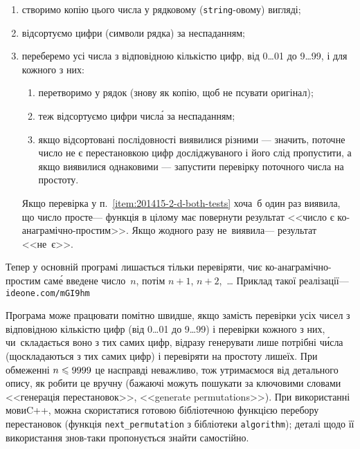 \begin{enumerate}
\item
створимо копію цього числа у рядковому (\texttt{string}-овому) вигляді;
\item
відсортуємо цифри (символи рядка) за неспаданням;
\item
переберемо усі числа з відповідною кількістю цифр, від 0\dots01 до 9\dots99, і для кожного з них:
\begin{enumerate}
\item
перетворимо у рядок (знову як копію, щоб не псувати оригінал);
\item
теж відсортуємо цифри числ\'{а} за неспаданням;
\item \label{item:201415-2-d-both-tests}
якщо відсортовані послідовності виявилися різними --- значить, поточне число не є перестановкою цифр досліджуваного і його слід пропустити, а якщо виявилися однаковими --- запустити перевірку поточного числа на простоту.
\end{enumerate}
Якщо перевірка у п.~\ref{item:201415-2-d-both-tests} хоча~б один раз виявила, що число просте\nolinebreak[3] --- функція в цілому має повернути результат <<число є ко-ана\-гра\-мічно-простим>>. Якщо жодного разу не~виявила\nolinebreak[3] --- результат <<не~є>>.
\end{enumerate}

Тепер у основній програмі лишається тільки перевіряти, чи\nolinebreak[3] є ко-ана\-гра\-мічно-простим сам\'{е} введене число~$n$, потім $n{+}1$, $n{+}2$,~\dots{} Приклад такої реалізації\nolinebreak[3] --- \verb"ideone.com/mGI9hm"

Програма може працювати помітно швидше, якщо замість перевірки усіх чисел з відповідною кількістю цифр (від 0\dots01 до 9\dots99) і перевірки кожного з них, чи~складається воно з тих самих цифр, відразу генерувати лише потрібні ч\'{и}сла (що\nolinebreak[3] складаються з тих самих цифр) і перевіряти на простоту лише\nolinebreak[3] їх. При обмеженні $n\leqslant9999$ це насправді неважливо, тож утримаємося від детального опису, як робити це вручну (бажаючі можуть пошукати за ключовими словами <<генерація перестановок>>, <<generate permutations>>). При використанні мови\nolinebreak[2] C++, можна скористатися готовою бібліотечною функцією перебору перестановок (функція \verb"next_permutation" з бібліотеки \verb"algorithm"); деталі щодо її використання знов-таки пропонується знайти самостійно.
